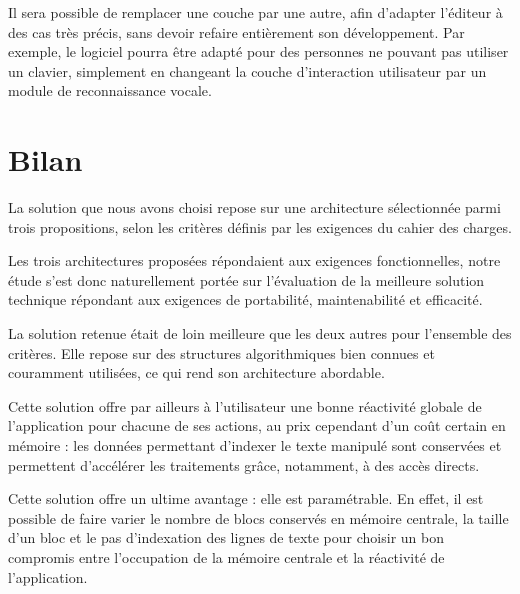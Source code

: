 Il sera possible de remplacer une couche par une autre, afin d'adapter
l'éditeur à des cas très précis, sans devoir refaire entièrement son
développement. Par exemple, le logiciel pourra être adapté pour des personnes
ne pouvant pas utiliser un clavier, simplement en changeant la couche
d'interaction utilisateur par un module de reconnaissance vocale.


\section{Bilan}
La solution que nous avons choisi repose sur une architecture sélectionnée
parmi trois propositions, selon les critères définis par les exigences du
cahier des charges.

Les trois architectures proposées répondaient aux exigences fonctionnelles, notre
étude s'est donc naturellement portée sur l'évaluation de la meilleure solution
technique répondant aux exigences de portabilité, maintenabilité et efficacité.

La solution retenue était de loin meilleure que les deux autres pour l'ensemble
des critères. Elle repose sur des structures algorithmiques bien connues et
couramment utilisées, ce qui rend son architecture abordable.

Cette solution offre par ailleurs à l'utilisateur une bonne réactivité globale
de l'application pour chacune de ses actions, au prix cependant d'un coût certain
en mémoire : les données permettant d'indexer le texte manipulé sont conservées
et permettent d'accélérer les traitements grâce, notamment, à des accès
directs.

Cette solution offre un ultime avantage : elle est paramétrable. En effet, il est
possible de faire varier le nombre de blocs conservés en mémoire centrale, la
taille d'un bloc et le pas d'indexation des lignes de texte pour choisir un bon
compromis entre l'occupation de la mémoire centrale et la réactivité de
l'application.
